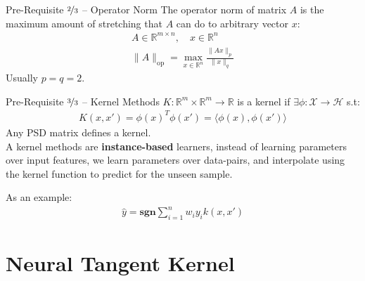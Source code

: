 \documentclass{beamer}
\begin{document}
\begin{frame}{Pre-Requisite $\nicefrac{2}{3}$ -- Operator Norm}
	The operator norm of matrix $A$ is the maximum amount of stretching that $A$ can do to arbitrary vector $x$:
	\begin{gather}
		A \in \mathbb{R}^{m \times n}, \quad x \in \mathbb{R}^n \\
		\|A\|_{\text{op}} = \max_{x \in \mathbb{R}^n} \frac{\| Ax \|_p}{\| x \|_q}
	\end{gather}
	Usually $p = q = 2$.
\end{frame}

\begin{frame}{Pre-Requisite $\nicefrac{3}{3}$ -- Kernel Methods}
	$K: \mathbb{R}^m \times \mathbb{R}^m \rightarrow \mathbb{R}$ is a kernel if $\exists\phi: \mathcal{X} \rightarrow \mathcal{H}$ s.t:
	\begin{gather}
		K(x, x') = \phi(x)^T \phi(x') = \langle \phi(x), \phi(x') \rangle
	\end{gather}
	Any PSD matrix defines a kernel. \pause \newline \\

	A kernel methods are \textbf{instance-based} learners, instead of learning parameters over input features, we learn parameters over data-pairs, and interpolate using the kernel function to predict for the unseen sample. \pause \newline 

	As an example:
	\begin{gather}
		\hat{y} = \textbf{sgn} \sum^n_{i=1} w_i y_i k(x, x')
	\end{gather}
\end{frame}


\section{Neural Tangent Kernel}
\end{document}
